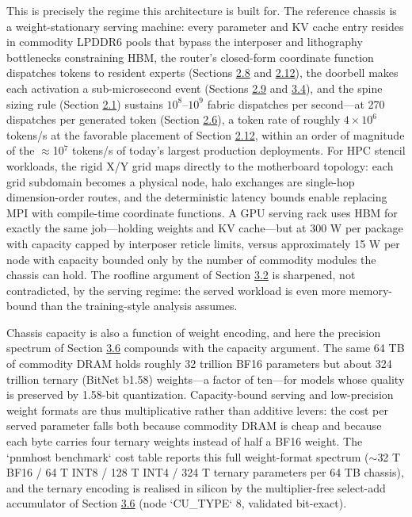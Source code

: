 \documentclass[12pt,onecolumn]{article}
\begin{document}
This is precisely the regime this architecture is built for. The reference chassis is a weight-stationary serving machine: every parameter and KV cache entry resides in commodity LPDDR6 pools that bypass the interposer and lithography bottlenecks constraining HBM, the router's closed-form coordinate function dispatches tokens to resident experts (Sections \hyperref[sec:2.8]{2.8} and \hyperref[sec:2.12]{2.12}), the doorbell makes each activation a sub-microsecond event (Sections \hyperref[sec:2.9]{2.9} and \hyperref[sec:3.4]{3.4}), and the spine sizing rule (Section \hyperref[sec:2.1]{2.1}) sustains $10^{8}$--$10^{9}$ fabric dispatches per second---at 270 dispatches per generated token (Section \hyperref[sec:2.6]{2.6}), a token rate of roughly $4\times10^{6}$ tokens/s at the favorable placement of Section \hyperref[sec:2.12]{2.12}, within an order of magnitude of the $\approx$10$^{7}$ tokens/s of today's largest production deployments\cite{24}. For HPC stencil workloads, the rigid X/Y grid maps directly to the motherboard topology: each grid subdomain becomes a physical node, halo exchanges are single-hop dimension-order routes, and the deterministic latency bounds enable replacing MPI with compile-time coordinate functions. A GPU serving rack uses HBM for exactly the same job---holding weights and KV cache---but at 300 W per package with capacity capped by interposer reticle limits, versus approximately 15 W per node with capacity bounded only by the number of commodity modules the chassis can hold. The roofline argument of Section \hyperref[sec:3.2]{3.2} is sharpened, not contradicted, by the serving regime: the served workload is even more memory-bound than the training-style analysis assumes.

Chassis capacity is also a function of weight encoding, and here the precision spectrum of Section \hyperref[sec:3.6]{3.6} compounds with the capacity argument. The same 64 TB of commodity DRAM holds roughly 32 trillion BF16 parameters but about 324 trillion ternary (BitNet b1.58) weights---a factor of ten---for models whose quality is preserved by 1.58-bit quantization\cite{42}. Capacity-bound serving and low-precision weight formats are thus multiplicative rather than additive levers: the cost per served parameter falls both because commodity DRAM is cheap and because each byte carries four ternary weights instead of half a BF16 weight. The `pnmhost benchmark` cost table reports this full weight-format spectrum ($\sim$32 T BF16 / 64 T INT8 / 128 T INT4 / 324 T ternary parameters per 64 TB chassis), and the ternary encoding is realised in silicon by the multiplier-free select-add accumulator of Section \hyperref[sec:3.6]{3.6} (node `CU\_TYPE` 8, validated bit-exact).
\end{document}
